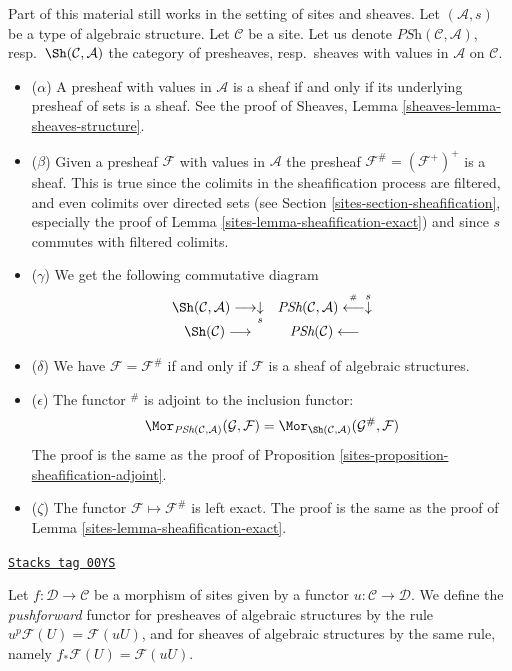 \medskip\noindent
Part of this material still works in the setting of sites and sheaves.
Let $(\mathcal{A}, s)$ be a type of algebraic structure.
Let $\mathcal{C}$ be a site. Let us denote
$\textit{PSh}(\mathcal{C}, \mathcal{A})$,
resp.\ $\Sh(\mathcal{C}, \mathcal{A})$ the category
of presheaves, resp.\ sheaves with values in $\mathcal{A}$ on $\mathcal{C}$.
\begin{itemize}
\item[] ($\alpha$) A presheaf with values in $\mathcal{A}$ is
a sheaf if and only if its underlying presheaf of sets is a sheaf.
See the proof of Sheaves, Lemma \ref{sheaves-lemma-sheaves-structure}.
\item[] ($\beta$) Given a presheaf $\mathcal{F}$ with values in
$\mathcal{A}$ the presheaf ${\mathcal{F}}^\# = (\mathcal{F}^+)^+$
is a sheaf. This is true since the colimits in the sheafification process
are filtered, and even colimits over directed sets (see
Section \ref{sites-section-sheafification}, especially the proof of
Lemma \ref{sites-lemma-sheafification-exact})
and since $s$ commutes with filtered colimits.
\item[] ($\gamma$) We get the following commutative diagram
$$
\begin{array}{cc}\Sh(\mathcal{C}, \mathcal{A}) \longrightarrow\underset{s}{\downarrow} & \textit{PSh}(\mathcal{C}, \mathcal{A}) \overset{{}^\#}{\longleftarrow}\overset{s}{\downarrow} \\ \Sh(\mathcal{C}) \longrightarrow & \textit{PSh}(\mathcal{C}) \longleftarrow\end{array}
$$
\item[] ($\delta$) We have $\mathcal{F} = \mathcal{F}^\#$ if and only if
$\mathcal{F}$ is a sheaf of algebraic structures.
\item[] ($\epsilon$) The functor ${}^\#$ is adjoint to the inclusion functor:
$$
\Mor_{\textit{PSh}(\mathcal{C}, \mathcal{A})}(\mathcal{G}, \mathcal{F})
=
\Mor_{\Sh(\mathcal{C}, \mathcal{A})}(\mathcal{G}^\#, \mathcal{F})
$$
The proof is the same as the proof of
Proposition \ref{sites-proposition-sheafification-adjoint}.
\item[] ($\zeta$) The functor
$\mathcal{F} \mapsto \mathcal{F}^\#$ is left exact.
The proof is the same as the proof of Lemma \ref{sites-lemma-sheafification-exact}.
\end{itemize}

\begin{definition}
\label{sites-definition-pushforward-algebraic-structures}
\href{https://stacks.math.columbia.edu/tag/00YS}{\texttt{Stacks tag 00YS}}

Let $f : \mathcal{D} \to \mathcal{C}$ be a morphism of sites
given by a functor $u : \mathcal{C} \to \mathcal{D}$.
We define the {\it pushforward} functor for presheaves of algebraic structures
by the rule $u^p\mathcal{F}(U) = \mathcal{F}(uU)$,
and for sheaves of algebraic structures by the same rule, namely
$f_*\mathcal{F}(U) = \mathcal{F}(uU)$.
\end{definition}

